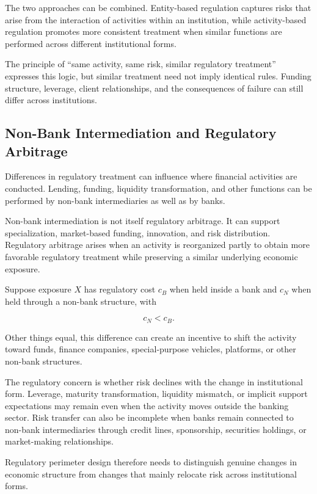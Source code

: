 The two approaches can be combined. Entity-based regulation captures risks that arise from the interaction of activities within an institution, while activity-based regulation promotes more consistent treatment when similar functions are performed across different institutional forms.

The principle of ``same activity, same risk, similar regulatory treatment'' expresses this logic, but similar treatment need not imply identical rules. Funding structure, leverage, client relationships, and the consequences of failure can still differ across institutions.

\subsection{Non-Bank Intermediation and Regulatory Arbitrage}

Differences in regulatory treatment can influence where financial activities are conducted. Lending, funding, liquidity transformation, and other functions can be performed by non-bank intermediaries as well as by banks.

Non-bank intermediation is not itself regulatory arbitrage. It can support specialization, market-based funding, innovation, and risk distribution. Regulatory arbitrage arises when an activity is reorganized partly to obtain more favorable regulatory treatment while preserving a similar underlying economic exposure.

Suppose exposure \(X\) has regulatory cost \(c_B\) when held inside a bank and \(c_N\) when held through a non-bank structure, with

\begin{equation}
c_N<c_B.
\label{eq:ch23-reg-arbitrage}
\end{equation}

Other things equal, this difference can create an incentive to shift the activity toward funds, finance companies, special-purpose vehicles, platforms, or other non-bank structures.

The regulatory concern is whether risk declines with the change in institutional form. Leverage, maturity transformation, liquidity mismatch, or implicit support expectations may remain even when the activity moves outside the banking sector. Risk transfer can also be incomplete when banks remain connected to non-bank intermediaries through credit lines, sponsorship, securities holdings, or market-making relationships.

Regulatory perimeter design therefore needs to distinguish genuine changes in economic structure from changes that mainly relocate risk across institutional forms.


